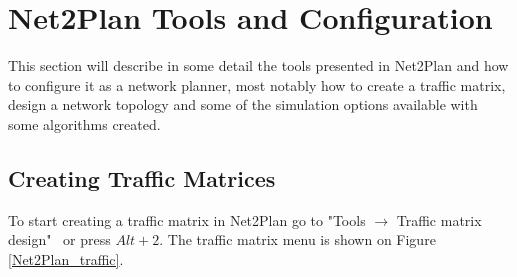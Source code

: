 %		
%	
%		
%		
%
%		   	

\newpage
\section*{Net2Plan Tools and Configuration}
This section will describe in some detail the tools presented in Net2Plan and how to configure it as a network planner, most notably how to create a traffic matrix, design a network topology and some of the simulation options available with some algorithms created.

	\subsection*{Creating Traffic Matrices}
    To start creating a traffic matrix in Net2Plan go to "Tools $\rightarrow$ Traffic matrix design" \ or press $Alt+2$. The traffic matrix menu is shown on Figure \ref{Net2Plan_traffic}.
	
